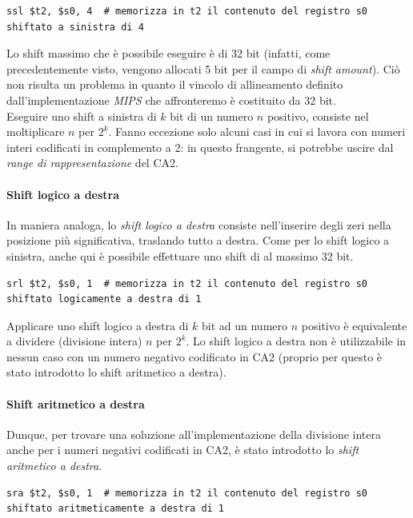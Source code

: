 \documentclass[class=book, crop=false]{standalone}
\begin{document}
\begin{verbatim}
ssl $t2, $s0, 4  # memorizza in t2 il contenuto del registro s0 shiftato a sinistra di 4
\end{verbatim}

Lo shift massimo che è possibile eseguire è di 32 bit (infatti, come precedentemente visto, vengono allocati 5 bit per il campo di \emph{shift amount}). Ciò non risulta un problema in quanto il vincolo di allineamento definito dall'implementazione \emph{MIPS} che affronteremo è costituito da 32 bit.\\
Eseguire uno shift a sinistra di \(k\) bit di un numero \(n\) positivo, consiste nel moltiplicare \(n\) per \(2^k\). Fanno eccezione solo alcuni casi in cui si lavora con numeri interi codificati in complemento a 2: in questo frangente, si potrebbe uscire dal \emph{range di rappresentazione} del CA2.

\paragraph{Shift logico a destra}
In maniera analoga, lo \emph{shift logico a destra} consiste nell'inserire degli zeri nella posizione più significativa, traslando tutto a destra. Come per lo shift logico a sinistra, anche qui è possibile effettuare uno shift di al massimo 32 bit.

\begin{verbatim}
srl $t2, $s0, 1  # memorizza in t2 il contenuto del registro s0 shiftato logicamente a destra di 1
\end{verbatim}

Applicare uno shift logico a destra di \(k\) bit ad un numero \(n\) positivo è equivalente a dividere (divisione intera) \(n\) per \(2^k\). Lo shift logico a destra non è utilizzabile in nessun caso con un numero negativo codificato in CA2 (proprio per questo è stato introdotto lo shift aritmetico a destra).

\paragraph{Shift aritmetico a destra}
Dunque, per trovare una soluzione all'implementazione della divisione intera anche per i numeri negativi codificati in CA2, è stato introdotto lo \emph{shift aritmetico a destra}.

\begin{verbatim}
sra $t2, $s0, 1  # memorizza in t2 il contenuto del registro s0 shiftato aritmeticamente a destra di 1
\end{verbatim}
\end{document}

